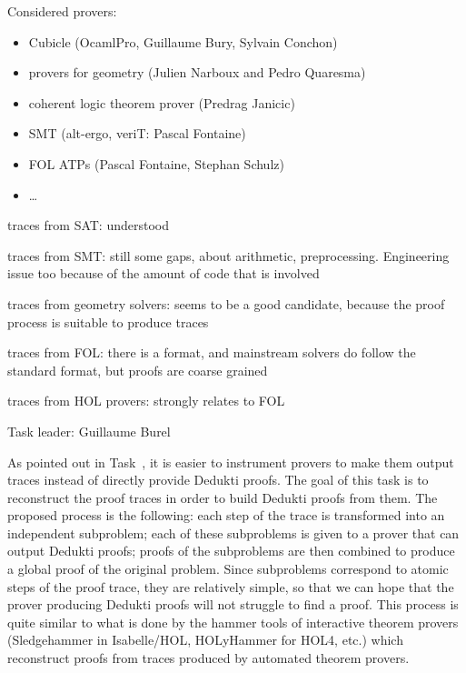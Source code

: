 \begin{workpackage}
\begin{tasklist}
\begin{task}[id=instrumenting, title=Instrumenting ATPs to produce
  traces]
Considered provers:
\begin{itemize}
\item Cubicle (OcamlPro, Guillaume Bury, Sylvain Conchon)
\item provers for geometry (Julien Narboux and Pedro Quaresma)
\item coherent logic theorem prover (Predrag Janicic)
\item SMT (alt-ergo, veriT: Pascal Fontaine)
\item FOL ATPs (Pascal Fontaine, Stephan Schulz)
\item \dots
\end{itemize}

traces from SAT: understood

traces from SMT: still some gaps, about arithmetic, preprocessing.  Engineering issue too because of the amount of code that is involved

traces from geometry solvers: seems to be a good candidate, because the proof process is suitable to produce traces

traces from FOL: there is a format, and mainstream solvers do follow the standard format, but proofs are coarse grained

traces from HOL provers: strongly relates to FOL

\end{task}


\begin{task}[id=tracetodedukti, title=Translate ATP traces into Dedukti]
  Task leader: Guillaume Burel

As pointed out in Task~, it is easier to
instrument provers to make them output traces instead of directly
provide Dedukti proofs. The goal of this task is to reconstruct the
proof traces in order to build Dedukti proofs from them. The proposed
process is the following: each step of the trace is transformed into
an independent subproblem; each of these subproblems is given to a
prover that can output Dedukti proofs; proofs of the subproblems are
then combined to produce a global proof of the original problem. Since
subproblems correspond to atomic steps of the proof trace, they are
relatively simple, so that we can hope that the prover producing
Dedukti proofs will not struggle to find a proof. This process is
quite similar to what is done by the hammer tools of interactive
theorem provers (Sledgehammer in Isabelle/HOL, HOLyHammer for HOL4, etc.)
which reconstruct proofs from traces produced by automated theorem
provers.


\end{task}
\end{tasklist}
\end{workpackage}
